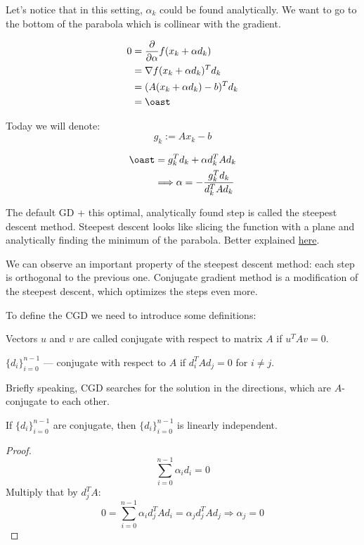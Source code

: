 Let's notice that in this setting, $\alpha_k$ could be found analytically. We want to go to the bottom of the parabola which is collinear with the gradient.

\begin{align*}
    0 &= \frac{\partial}{\partial \alpha} f(x_k + \alpha d_k) \\ 
    &= \nabla f(x_k + \alpha d_k)^T d_k \\
    &= (A(x_k + \alpha d_k) - b)^T d_k \\
    &= \oast
\end{align*}

Today we will denote: 
\[ 
    g_k := A x_k - b
\] 

\begin{align*}
    \oast &= g^T_k d_k + \alpha d_k^T A d_k  \\ 
    &\Longrightarrow \alpha = - \frac{g_k^T d_k}{d_k^T A d_k}
\end{align*}

The default GD + this optimal, analytically found step is called the steepest descent method. Steepest descent looks like slicing the function with a plane and analytically finding the minimum of the parabola. Better explained \href{https://gregorygundersen.com/blog/2022/03/20/conjugate-gradient-descent/}{here}.


We can observe an important property of the steepest descent method: each step is orthogonal to the previous one. Conjugate gradient method is a modification of the steepest descent, which optimizes the steps even more. 

To define the CGD we need to introduce some definitions: 

\begin{conj}
    Vectors $u$ and $v$ are called conjugate with respect to matrix $A$ if $u^T A v = 0$.
\end{conj}

\begin{conj}
    $\{d_i\}^{n-1}_{i=0}$ --- conjugate with respect  to $A$ if $d_i^T A d_j = 0$ for $i \neq j$.
\end{conj}

Briefly speaking, CGD searches for the solution in the directions, which are $A$-conjugate to each other.

\begin{theorem}
    If $\{d_i\}^{n-1}_{i=0}$ are conjugate, then $\{d_i\}^{n-1}_{i=0}$ is linearly independent.
\end{theorem}
\begin{proof}
    \[
        \sum^{n-1}_{i=0} \alpha_i d_i = 0 
    \]
    Multiply that by $d_j^T A$:
    \[
        0 = \sum^{n-1}_{i=0} \alpha_i d_j^T A d_i = \alpha_j d_j^T A d_j \Longrightarrow \alpha_j = 0
    \]
\end{proof}

